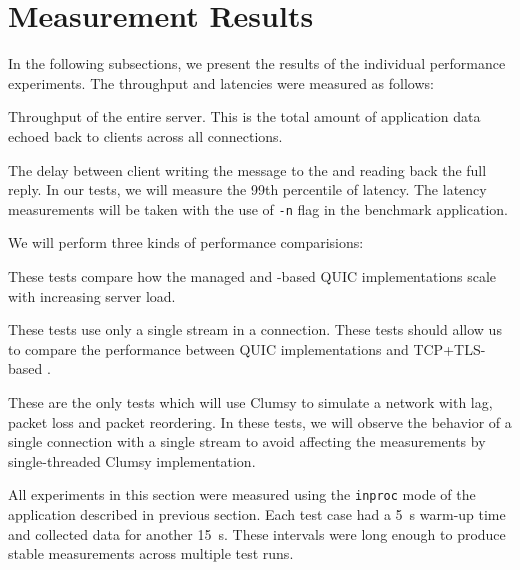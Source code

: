 \section{Measurement Results}\label{sec:04-perf-results}

In the following subsections, we present the results of the individual performance experiments. The
throughput and latencies were measured as follows:

\begin{itemize}

   Throughput of the entire server. This is the total amount of application data
  echoed back to clients across all connections.

   The delay between client writing the message to the \Stream{} and reading back the
full reply. In our tests, we will measure the 99th percentile of latency. The latency measurements
will be taken with the use of \texttt{-n} flag in the benchmark application.

\end{itemize}

We will perform three kinds of performance comparisions:

\begin{itemize}

   These tests compare how the managed and \libmsquic{}-based
QUIC implementations scale with increasing server load.

   These tests use only a single stream in a connection. These
tests should allow us to compare the performance between QUIC implementations and TCP+TLS-based
\SslStream{}.

   These are the only tests which will use Clumsy
to simulate a network with lag, packet loss and packet reordering. In these tests, we will observe
the behavior of a single connection with a single stream to avoid affecting the measurements by
single-threaded Clumsy implementation.

\end{itemize}

All experiments in this section were measured using the \texttt{inproc} mode of the application
described in previous section. Each test case had a \SI{5}{\second} warm-up time and collected data
for another \SI{15}{\second}. These intervals were long enough to produce stable measurements across
multiple test runs.

